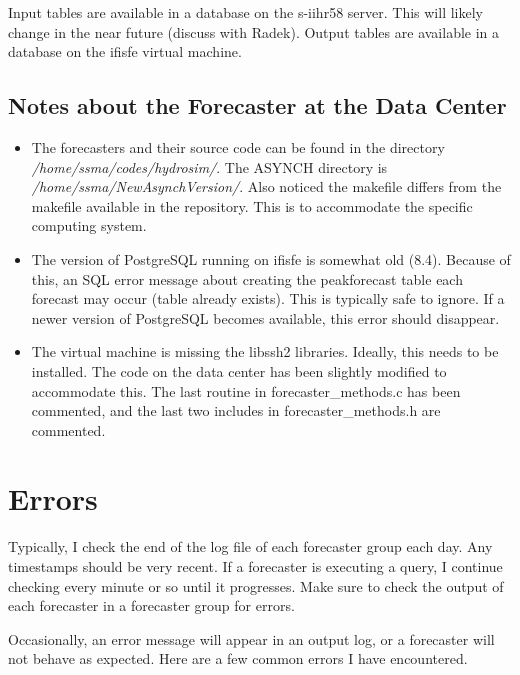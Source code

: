 \documentclass[12pt]{article}
\begin{document}
Input tables are available in a database on the s-iihr58 server. This will likely change in the near future (discuss with Radek). Output tables are available in a database on the ifisfe virtual machine.

\subsection{Notes about the Forecaster at the Data Center} \label{sec: notes about the data center}

\begin{itemize}
 \item The forecasters and their source code can be found in the directory \emph{/home/ssma/codes/hydrosim/}. The ASYNCH directory is \emph{/home/ssma/NewAsynchVersion/}. Also noticed the makefile differs from the makefile available in the repository. This is to accommodate the specific computing system.
 \item The version of PostgreSQL running on ifisfe is somewhat old (8.4). Because of this, an SQL error message about creating the peakforecast table each forecast may occur (table already exists). This is typically safe to ignore. If a newer version of PostgreSQL becomes available, this error should disappear.
 \item The virtual machine is missing the libssh2 libraries. Ideally, this needs to be installed. The code on the data center has been slightly modified to accommodate this. The last routine in forecaster\_methods.c has been commented, and the last two includes in forecaster\_methods.h are commented.
\end{itemize}


\section{Errors} \label{sec: errors}

Typically, I check the end of the log file of each forecaster group each day. Any timestamps should be very recent. If a forecaster is executing a query, I continue checking every minute or so until it progresses. Make sure to check the output of each forecaster in a forecaster group for errors.

Occasionally, an error message will appear in an output log, or a forecaster will not behave as expected. Here are a few common errors I have encountered.
\end{document}

